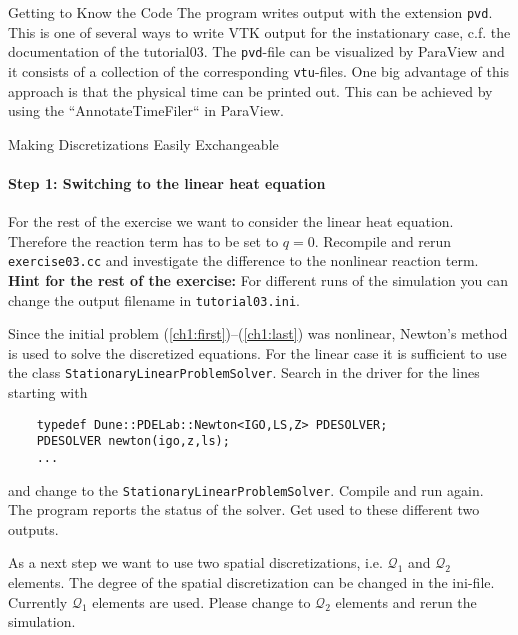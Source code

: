 \documentclass[12pt,a4paper]{article}
\begin{document}
\begin{Exercise}{Getting to Know the Code}
  The program writes output with the extension \lstinline!pvd!. This is one
  of several ways to write VTK output for the instationary case,
  c.f. the documentation of the tutorial03. The \lstinline!pvd!-file can
  be visualized by ParaView and it consists of a collection of the
  corresponding \lstinline!vtu!-files.
  One big advantage of this approach is that the physical time can be
  printed out. This can be achieved by using the ``AnnotateTimeFiler``
  in ParaView.

\end{Exercise}

\begin{Exercise}{Making Discretizations Easily Exchangeable}

  \paragraph{Step 1: Switching to the linear heat equation}
  For the rest of the exercise we want to consider the linear heat
  equation. Therefore the reaction term has to be set to $q =
  0$. Recompile and rerun \lstinline!exercise03.cc! and investigate the
  difference to the nonlinear reaction term. \newline
  \textbf{Hint for the rest of the exercise:} For different runs of the
  simulation you can change the output filename in
  \lstinline!tutorial03.ini!.

  Since the initial problem (\ref{ch1:first})--(\ref{ch1:last}) was
  nonlinear, Newton's method is used to solve the discretized
  equations. For the linear case it is sufficient to use the class
  \lstinline!StationaryLinearProblemSolver!. Search in the driver for
  the lines starting with
  \begin{lstlisting}
    typedef Dune::PDELab::Newton<IGO,LS,Z> PDESOLVER;
    PDESOLVER newton(igo,z,ls);
    ...
  \end{lstlisting}
  and change to the \lstinline!StationaryLinearProblemSolver!. Compile
  and run again. The program reports the status of the solver. Get used
  to these different two outputs.

  As a next step we want to use two spatial discretizations,
  i.e. $\mathcal{Q}_1$ and $\mathcal{Q}_2$ elements. The degree of the
  spatial discretization can be changed in the ini-file. Currently
  $\mathcal{Q}_1$ elements are used. Please change to $\mathcal{Q}_2$
  elements and rerun the simulation.


\end{Exercise}
\end{document}
